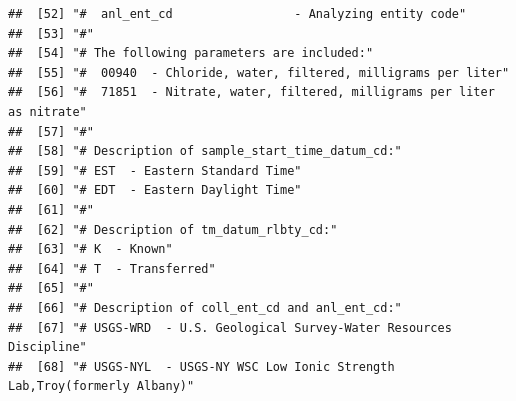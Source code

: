 \documentclass[
]{book}
\begin{document}
\begin{verbatim}
##  [52] "#  anl_ent_cd                 - Analyzing entity code"                                                                                        
##  [53] "#"                                                                                                                                            
##  [54] "# The following parameters are included:"                                                                                                     
##  [55] "#  00940  - Chloride, water, filtered, milligrams per liter"                                                                                  
##  [56] "#  71851  - Nitrate, water, filtered, milligrams per liter as nitrate"                                                                        
##  [57] "#"                                                                                                                                            
##  [58] "# Description of sample_start_time_datum_cd:"                                                                                                 
##  [59] "# EST  - Eastern Standard Time"                                                                                                               
##  [60] "# EDT  - Eastern Daylight Time"                                                                                                               
##  [61] "#"                                                                                                                                            
##  [62] "# Description of tm_datum_rlbty_cd:"                                                                                                          
##  [63] "# K  - Known"                                                                                                                                 
##  [64] "# T  - Transferred"                                                                                                                           
##  [65] "#"                                                                                                                                            
##  [66] "# Description of coll_ent_cd and anl_ent_cd:"                                                                                                 
##  [67] "# USGS-WRD  - U.S. Geological Survey-Water Resources Discipline"                                                                              
##  [68] "# USGS-NYL  - USGS-NY WSC Low Ionic Strength Lab,Troy(formerly Albany)"                                                                       

\end{verbatim}
\end{document}

